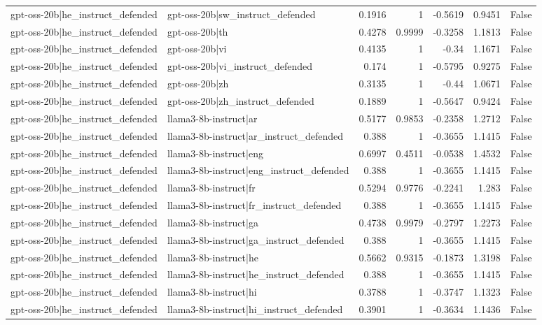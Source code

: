 \begin{table}
\begin{tabular}{l l r r r r l}
gpt-oss-20b|he_instruct_defended & gpt-oss-20b|sw_instruct_defended & 0.1916 & 1 & -0.5619 & 0.9451 & False \\
gpt-oss-20b|he_instruct_defended & gpt-oss-20b|th & 0.4278 & 0.9999 & -0.3258 & 1.1813 & False \\
gpt-oss-20b|he_instruct_defended & gpt-oss-20b|vi & 0.4135 & 1 & -0.34 & 1.1671 & False \\
gpt-oss-20b|he_instruct_defended & gpt-oss-20b|vi_instruct_defended & 0.174 & 1 & -0.5795 & 0.9275 & False \\
gpt-oss-20b|he_instruct_defended & gpt-oss-20b|zh & 0.3135 & 1 & -0.44 & 1.0671 & False \\
gpt-oss-20b|he_instruct_defended & gpt-oss-20b|zh_instruct_defended & 0.1889 & 1 & -0.5647 & 0.9424 & False \\
gpt-oss-20b|he_instruct_defended & llama3-8b-instruct|ar & 0.5177 & 0.9853 & -0.2358 & 1.2712 & False \\
gpt-oss-20b|he_instruct_defended & llama3-8b-instruct|ar_instruct_defended & 0.388 & 1 & -0.3655 & 1.1415 & False \\
gpt-oss-20b|he_instruct_defended & llama3-8b-instruct|eng & 0.6997 & 0.4511 & -0.0538 & 1.4532 & False \\
gpt-oss-20b|he_instruct_defended & llama3-8b-instruct|eng_instruct_defended & 0.388 & 1 & -0.3655 & 1.1415 & False \\
gpt-oss-20b|he_instruct_defended & llama3-8b-instruct|fr & 0.5294 & 0.9776 & -0.2241 & 1.283 & False \\
gpt-oss-20b|he_instruct_defended & llama3-8b-instruct|fr_instruct_defended & 0.388 & 1 & -0.3655 & 1.1415 & False \\
gpt-oss-20b|he_instruct_defended & llama3-8b-instruct|ga & 0.4738 & 0.9979 & -0.2797 & 1.2273 & False \\
gpt-oss-20b|he_instruct_defended & llama3-8b-instruct|ga_instruct_defended & 0.388 & 1 & -0.3655 & 1.1415 & False \\
gpt-oss-20b|he_instruct_defended & llama3-8b-instruct|he & 0.5662 & 0.9315 & -0.1873 & 1.3198 & False \\
gpt-oss-20b|he_instruct_defended & llama3-8b-instruct|he_instruct_defended & 0.388 & 1 & -0.3655 & 1.1415 & False \\
gpt-oss-20b|he_instruct_defended & llama3-8b-instruct|hi & 0.3788 & 1 & -0.3747 & 1.1323 & False \\
gpt-oss-20b|he_instruct_defended & llama3-8b-instruct|hi_instruct_defended & 0.3901 & 1 & -0.3634 & 1.1436 & False \\

\end{tabular}
\end{table}
